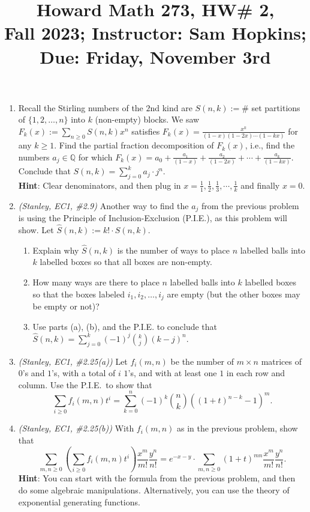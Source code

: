 \documentclass[11pt]{article}
\title{Howard Math 273, HW\# 2, \\ {\normalsize Fall 2023; Instructor: Sam Hopkins; Due: Friday, November 3rd}}
\date{}
\begin{document}
\maketitle

\thispagestyle{empty}

\vspace{-1.8cm}

\begin{enumerate}

\item Recall the Stirling numbers of the $2$nd kind are $S(n,k) := \#$ set partitions of $\{1,2,\ldots,n\}$ into $k$ (non-empty) blocks. We saw $F_k(x) := \sum_{n\geq 0}S(n,k)x^n$ satisfies $F_k(x) = \frac{x^k}{(1-x)(1-2x)\cdots(1-kx)}$ for any $k \geq 1$. Find the partial fraction decomposition of $F_k(x)$, i.e., find the numbers $a_j \in \mathbb{Q}$ for which $F_k(x) = a_0 + \frac{a_1}{(1-x)} + \frac{a_2}{(1-2x)} + \cdots + \frac{a_k}{(1-kx)}$. Conclude that $S(n,k) = \sum_{j=0}^{k} a_j \cdot j^n$. \\
{\bf Hint}: Clear denominators, and then plug in $x=\frac{1}{1}, \frac{1}{2}, \frac{1}{3}, \cdots, \frac{1}{k}$ and finally $x=0$.

\item \emph{(Stanley, EC1, \#2.9)} Another way to find the $a_j$ from the previous problem is using the Principle of Inclusion-Exclusion (P.I.E.), as this problem will show. Let $\widehat{S}(n,k) := k! \cdot S(n,k)$. 
\begin{enumerate}
\item Explain why $\widehat{S}(n,k)$ is the number of ways to place $n$ labelled balls into $k$ labelled boxes so that all boxes are non-empty.
\item How many ways are there to place $n$ labelled balls into $k$ labelled boxes so that the boxes labeled $i_1,i_2,\ldots,i_j$ are empty (but the other boxes may be empty or not)?
\item Use parts (a), (b), and the P.I.E. to conclude that $\widehat{S}(n,k) = \sum_{j=0}^{k} (-1)^j \binom{k}{j}(k-j)^n$.
\end{enumerate}

\item \emph{(Stanley, EC1, \#2.25(a))} Let $f_i(m,n)$ be the number of $m\times n$ matrices of $0$'s and $1$'s, with a total of $i$ $1$'s, and with at least one $1$ in each row and column. Use the P.I.E.~to show that
\[ \sum_{i \geq 0} f_i(m,n) t^i = \sum_{k=0}^{n}(-1)^k\binom{n}{k}( (1+t)^{n-k}-1)^m.\]

\item \emph{(Stanley, EC1, \#2.25(b))} With $f_i(m,n)$ as in the previous problem, show that
\[ \sum_{m,n \geq 0} \left(\sum_{i \geq 0} f_i(m,n) t^i \right) \frac{x^m}{m!} \frac{y^n}{n!} = e^{-x-y} \cdot \sum_{m,n \geq 0}  (1+t)^{mn} \frac{x^m}{m!} \frac{y^n}{n!} .\]
{\bf Hint}: You can start with the formula from the previous problem, and then do some algebraic manipulations. Alternatively, you can use the theory of exponential generating functions.


\end{enumerate}
\end{document}
